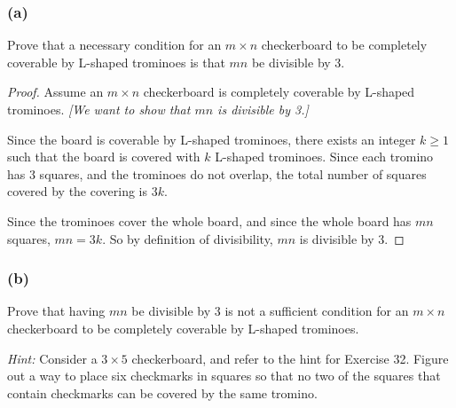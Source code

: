 \documentclass[14pt]{extarticle}
\begin{document}
\subsubsection{(a)}
Prove that a necessary condition for an $m \times n$ checkerboard to be completely coverable by L-shaped trominoes is that $mn$ be divisible by 3.

\begin{proof}
Assume an $m \times n$ checkerboard is completely coverable by L-shaped trominoes. {\it [We want to show that $mn$ is divisible by 3.]}

Since the board is coverable by L-shaped trominoes, there exists an integer $k \geq 1$ such that the board is covered with $k$ L-shaped trominoes. Since each tromino has 3 squares, and the trominoes do not overlap, the total number of squares covered by the covering is $3k$. 

Since the trominoes cover the whole board, and since the whole board has $mn$ squares, $mn = 3k$. So by definition of divisibility, $mn$ is divisible by 3.
\end{proof}

\subsubsection{(b)}
Prove that having $mn$ be divisible by 3 is not a sufficient condition for an $m \times n$ checkerboard to be completely coverable by L-shaped trominoes.

{\it Hint:} Consider a $3 \times 5$ checkerboard, and refer to the hint for Exercise 32. Figure out a way to place six checkmarks in squares so that no two of the squares that contain checkmarks can be covered by the same tromino.
\end{document}
